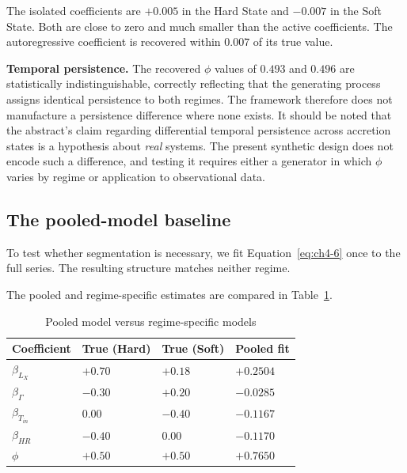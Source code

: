 The isolated coefficients are $+0.005$ in the Hard State and $-0.007$ in the Soft State.
Both are close to zero and much smaller than the active coefficients. The
autoregressive coefficient is recovered within $0.007$ of its true value.

\textbf{Temporal persistence.} The recovered $\phi$ values of $0.493$ and $0.496$ are
statistically indistinguishable, correctly reflecting that the generating process
assigns identical persistence to both regimes. The framework therefore does not
manufacture a persistence difference where none exists. It should be noted that the
abstract's claim regarding differential temporal persistence across accretion states is
a hypothesis about \textit{real} systems. The present synthetic design does not encode such a
difference, and testing it requires either a generator in which $\phi$ varies by regime
or application to observational data.


\subsection{The pooled-model baseline}

To test whether segmentation is necessary, we fit Equation~\eqref{eq:ch4-6} once
to the full series. The resulting structure matches neither regime.

The pooled and regime-specific estimates are compared in Table~\ref{tab:ch5-pooled}.



\begin{table}[htbp]
    \centering
    \small
    \caption{Pooled model versus regime-specific models}
    \label{tab:ch5-pooled}
    \begin{tabularx}{\textwidth}{|>{\raggedright\arraybackslash}X|>{\raggedright\arraybackslash}X|>{\raggedright\arraybackslash}X|>{\raggedright\arraybackslash}X|}
        \hline
        Coefficient & True (Hard) & True (Soft) & Pooled fit \\ \hline
        $\beta_{L_X}$ & $+0.70$ & $+0.18$ & $+0.2504$ \\ \hline
        $\beta_{\Gamma}$ & $-0.30$ & $+0.20$ & $-0.0285$ \\ \hline
        $\beta_{T_{in}}$ & $0.00$ & $-0.40$ & $-0.1167$ \\ \hline
        $\beta_{HR}$ & $-0.40$ & $0.00$ & $-0.1170$ \\ \hline
        $\phi$ & $+0.50$ & $+0.50$ & $+0.7650$ \\ \hline
    \end{tabularx}
\end{table}

